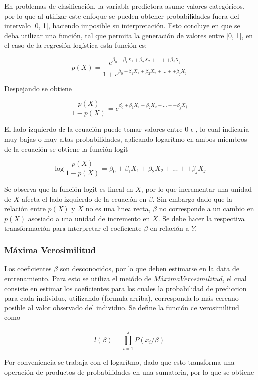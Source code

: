\documentclass[a4paper,12pt]{Latex/Classes/PhDthesisPSnPDF}
\begin{document}
En problemas de clasificación, la variable predictora asume valores categóricos, por lo que al utilizar este enfoque se pueden obtener probabilidades fuera del intervalo [0, 1], haciendo imposible su interpretación. Esto concluye en que se deba utilizar una función, tal que permita la generación de valores entre [0, 1], en el caso de la regresión logística esta función es:

$$
p(X) = \frac{e^{\beta_{0} + \beta_{1}X_{1} + \beta_{2}X_{2} + ... + + \beta_{j}X_{j} }}{1 + e^{\beta_{0} + \beta_{1}X_{1} + \beta_{2}X_{2} + ... + + \beta_{j}X_{j} }}
$$

Despejando se obtiene

$$ \frac{p(X)}{1 - p(X)} = e^{\beta_{0} + \beta_{1}X_{1} + \beta_{2}X_{2} + ... + + \beta_{j}X_{j} } $$

El lado izquierdo de la ecuación puede tomar valores entre 0 e \infinity, lo cual indicaría muy bajas o muy altas probabilidades, aplicando logarítmo en ambos miembros de la ecuación se obtiene la función logit

$$ \log{\frac{p(X)}{1 - p(X)}} = \beta_{0} + \beta_{1}X_{1} + \beta_{2}X_{2} + ... + + \beta_{j}X_{j}  $$

Se observa que la función logit es lineal en $X$, por lo que incrementar una unidad de $X$ afecta el lado izquierdo de la ecuación en $\beta$. Sin embargo dado que la relación entre $p(X)$ y $X$ no es una linea recta, $\beta$ no corresponde a un cambio en $p(X)$ asosiado a una unidad de incremento en $X$. Se debe hacer la respectiva transformación para interpretar el coeficiente $\beta$ en relación a $Y$.

\subsubsection{Máxima Verosimilitud}

Los coeficientes $\beta$ son desconocidos, por lo que deben estimarse en la data de entrenamiento. Para esto se utiliza el metódo de $Máxima Verosimilitud$, el cual consiste en estimar los coeficientes para los cuales la probabilidad de prediccion para cada individuo, utilizando (formula arriba), corresponda lo más cercano posible al valor observado del individuo. Se define la función de verosimilitud como

$$ l(\beta) = \prod_{i=1}^{j}{P(x_{i} / \beta)} $$
  
Por conveniencia se  trabaja con el logarítmo, dado que esto transforma una operación de productos de probabilidades en una sumatoria, por lo que se obtiene
\end{document}
